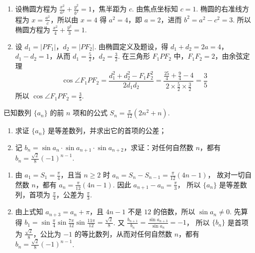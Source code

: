 \begin{solution}
\begin{enumerate}
\item 设椭圆方程为 \(\frac{x^2}{a^2}+\frac{y^2}{b^2}=1\)，焦半距为 \(c\). 由焦点坐标知 \(c=1\). 椭圆的右准线方程为 \(x=\frac{a^2}{c}\)，所以由 \(x=4\) 得 \(a^2=4\)，即 \(a=2\)，进而 \(b^2=a^2-c^2=3\). 所以椭圆方程为 \(\frac{x^2}{4}+\frac{y^2}{3}=1\).

\item 设 \(d_1=|PF_1|\)，\(d_2=|PF_2|\). 由椭圆定义及题设，得 \(d_1+d_2=2a=4\)，\(d_1-d_2=1\)，从而 \(d_1=\frac52\)，\(d_2=\frac32\). 在三角形 \(F_1PF_2\) 中，\(F_1F_2=2\)，由余弦定理
\[
\cos\angle F_1PF_2=\frac{d_1^2+d_2^2-F_1F_2^2}{2d_1d_2}=\frac{\frac{25}{4}+\frac94-4}{2\times\frac52\times\frac32}=\frac35
\]
所以 \(\cos\angle F_1PF_2=\frac35\).
\end{enumerate}
\end{solution}

\begin{problem}
已知数列 \(\{a_n\}\) 的前 \(n\) 项和的公式 \(S_n=\frac{\pi}{12}(2n^2+n)\).

\begin{enumerate}
\item 求证 \(\{a_n\}\) 是等差数列，并求出它的首项的公差；
\item 记 \(b_n=\sin a_n\cdot \sin a_{n+1}\cdot \sin a_{n+2}\)，求证：对任何自然数 \(n\)，都有 \(b_n=\frac{\sqrt{2}}{8}(-1)^{n-1}\).
\end{enumerate}
\end{problem}

\begin{solution}
\begin{enumerate}
\item 由 \(a_1=S_1=\frac\pi4\)，且当 \(n\geqslant2\) 时
\(a_n=S_n-S_{n-1}=\frac\pi{12}(4n-1)\)，
故对一切自然数 \(n\)，都有 \(a_n=\frac\pi{12}(4n-1)\). 因此
\(a_{n+1}-a_n=\frac\pi3\)，
所以 \(\{a_n\}\) 是等差数列，首项为 \(\frac\pi4\)，公差为 \(\frac\pi3\).

\item 由上式知 \(a_{n+3}=a_n+\pi\)，且 \(4n-1\) 不是 \(12\) 的倍数，所以 \(\sin a_n\neq0\). 先算得
\(b_1=\sin\frac\pi4\sin\frac{7\pi}{12}\sin\frac{11\pi}{12}=\frac{\sqrt{2}}8\).
又
\(\frac{b_{n+1}}{b_n}=\frac{\sin a_{n+3}}{\sin a_n}=-1\)，
所以 \(\{b_n\}\) 是首项为 \(\frac{\sqrt{2}}8\)，公比为 \(-1\) 的等比数列，从而对任何自然数 \(n\)，都有
\(b_n=\frac{\sqrt{2}}8(-1)^{n-1}\).
\end{enumerate}
\end{solution}
